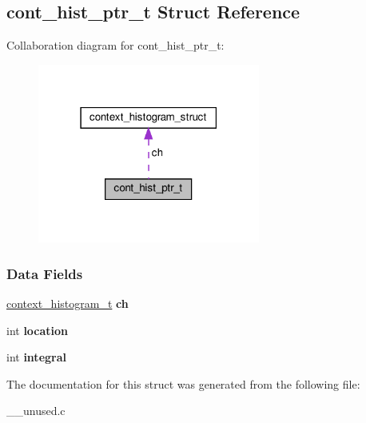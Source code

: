 \hypertarget{structcont__hist__ptr__t}{}\subsection{cont\+\_\+hist\+\_\+ptr\+\_\+t Struct Reference}
\label{structcont__hist__ptr__t}


Collaboration diagram for cont\+\_\+hist\+\_\+ptr\+\_\+t\+:\nopagebreak
\begin{figure}[H]
\begin{center}
\leavevmode
\includegraphics[width=207pt]{structcont__hist__ptr__t__coll__graph}
\end{center}
\end{figure}
\subsubsection*{Data Fields}
\begin{DoxyCompactItemize}
\item 
\mbox{\label{structcont__hist__ptr__t_ac34cfea9f9beb575198dc84dbae23b80}} 
\hyperlink{structcontext__histogram__struct}{context\+\_\+histogram\+\_\+t} {\bfseries ch}
\item 
\mbox{\label{structcont__hist__ptr__t_af760b9184e4c3daaa6f2fc5b6df97d5a}} 
int {\bfseries location}
\item 
\mbox{\label{structcont__hist__ptr__t_a03e2732c33bb949c978302a4a03f07ed}} 
int {\bfseries integral}
\end{DoxyCompactItemize}


The documentation for this struct was generated from the following file\+:\begin{DoxyCompactItemize}
\item 
\+\_\+\+\_\+unused.\+c\end{DoxyCompactItemize}
